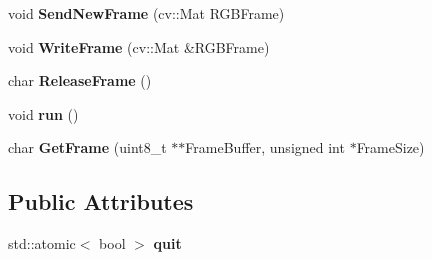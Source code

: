 \begin{DoxyCompactItemize}
void {\bfseries Send\+New\+Frame} (cv\+::\+Mat R\+G\+B\+Frame)
\item 
\mbox{\label{class_m_e_s_a_i_1_1_f_fmpeg_h264_encoder_acc8ed78ccf68e30d30ebb62565de11c3}} 
void {\bfseries Write\+Frame} (cv\+::\+Mat \&R\+G\+B\+Frame)
\item 
\mbox{\label{class_m_e_s_a_i_1_1_f_fmpeg_h264_encoder_aa42834033f0fba672020bc510a9739c2}} 
char {\bfseries Release\+Frame} ()
\item 
\mbox{\label{class_m_e_s_a_i_1_1_f_fmpeg_h264_encoder_a876d1dc5406ce3a427b4d31bba2fb163}} 
void {\bfseries run} ()
\item 
\mbox{\label{class_m_e_s_a_i_1_1_f_fmpeg_h264_encoder_a5614f1f368de7abba534e7517a493310}} 
char {\bfseries Get\+Frame} (uint8\+\_\+t $\ast$$\ast$Frame\+Buffer, unsigned int $\ast$Frame\+Size)
\end{DoxyCompactItemize}
\subsection*{Public Attributes}
\begin{DoxyCompactItemize}
\item 
\mbox{\label{class_m_e_s_a_i_1_1_f_fmpeg_h264_encoder_ae90e54edfbbc3341fcebe8f9345d7f4b}} 
std\+::atomic$<$ bool $>$ {\bfseries quit}
\end{DoxyCompactItemize}
